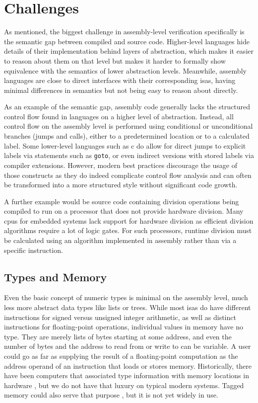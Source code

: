 \section{Challenges}\label{challenges}
As mentioned, the biggest challenge in assembly-level verification specifically is the semantic gap between compiled and source code.
Higher-level languages hide details of their implementation behind layers of abstraction, which makes it easier to reason about them on that level but makes it harder to formally show equivalence with the semantics of lower abstraction levels.
Meanwhile, assembly languages are close to direct interfaces with their corresponding \acp{isa}, having minimal differences in semantics but not being easy to reason about directly.

As an example of the semantic gap, assembly code generally lacks the structured control flow found in languages on a higher level of abstraction.
Instead, all control flow on the assembly level is performed using conditional or unconditional branches (jumps and calls), either to a predetermined location or to a calculated label.
Some lower-level languages such as \gls{c} do allow for direct jumps to explicit labels via statements such as \lstinline|goto|, or even indirect versions with stored labels via compiler extensions.
However, modern best practices discourage the usage of those constructs as they do indeed complicate control flow analysis and can often be transformed into a more structured style without significant code growth.

A further example would be source code containing division operations being compiled to run on a processor that does not provide hardware division.
Many \acp{cpu} for embedded systems lack support for hardware division as efficient division algorithms require a lot of logic gates.
For such processors, runtime division must be calculated using an algorithm implemented in assembly rather than via a specific instruction.

\subsection{Types and Memory}
Even the basic concept of numeric types is minimal on the assembly level, much less more abstract data types like lists or trees.
While most \acp{isa} do have different instructions for signed versus unsigned integer arithmetic, as well as distinct instructions for floating-point operations, individual values in memory have no type.
They are merely lists of bytes starting at some address, and even the number of bytes and the address to read from or write to can be variable.
A user could go as far as supplying the result of a floating-point computation as the address operand of an instruction that loads or stores memory.
Historically, there have been computers that associated type information with memory locations in hardware \autocite{feustel1972rice,feustel1973advantages,thornton2008rice}, but we do not have that luxury on typical modern systems.
Tagged memory could also serve that purpose , but it is not yet widely in use.


